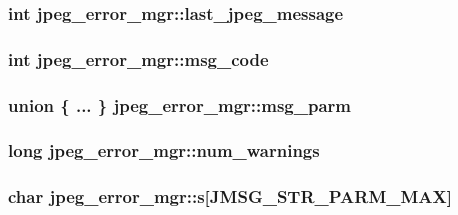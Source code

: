 \subsubsection[{last\+\_\+jpeg\+\_\+message}]{\setlength{\rightskip}{0pt plus 5cm}int jpeg\+\_\+error\+\_\+mgr\+::last\+\_\+jpeg\+\_\+message}\label{structjpeg__error__mgr_a01d4d8f17f2d2ad49e5bd981c01296b9}
\hypertarget{structjpeg__error__mgr_a27fcf9391530acf9075836c5d11fff00}{}
\subsubsection[{msg\+\_\+code}]{\setlength{\rightskip}{0pt plus 5cm}int jpeg\+\_\+error\+\_\+mgr\+::msg\+\_\+code}\label{structjpeg__error__mgr_a27fcf9391530acf9075836c5d11fff00}
\hypertarget{structjpeg__error__mgr_a9366d979c371cc8267be50571e163c30}{}
\subsubsection[{msg\+\_\+parm}]{\setlength{\rightskip}{0pt plus 5cm}union \{ ... \}   jpeg\+\_\+error\+\_\+mgr\+::msg\+\_\+parm}\label{structjpeg__error__mgr_a9366d979c371cc8267be50571e163c30}
\hypertarget{structjpeg__error__mgr_a6d74f34ca06fd61c9cc2b5818d317255}{}
\subsubsection[{num\+\_\+warnings}]{\setlength{\rightskip}{0pt plus 5cm}long jpeg\+\_\+error\+\_\+mgr\+::num\+\_\+warnings}\label{structjpeg__error__mgr_a6d74f34ca06fd61c9cc2b5818d317255}
\hypertarget{structjpeg__error__mgr_a0b335f0919d328a95f02440a4ec2216b}{}
\subsubsection[{s}]{\setlength{\rightskip}{0pt plus 5cm}char jpeg\+\_\+error\+\_\+mgr\+::s\mbox{[}{\bf J\+M\+S\+G\+\_\+\+S\+T\+R\+\_\+\+P\+A\+R\+M\+\_\+\+M\+A\+X}\mbox{]}}\label{structjpeg__error__mgr_a0b335f0919d328a95f02440a4ec2216b}
\hypertarget{structjpeg__error__mgr_a77328bf266cc3c3c4d9741fc27a4ef9b}{}
